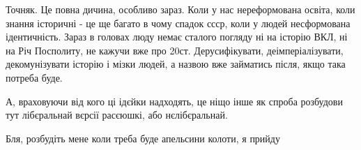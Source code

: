 \begin{itemize}
Точняк. Це повна дичина, особливо зараз. Коли у нас нереформована освіта, коли
знання історичні - це ще багато в чому спадок ссср, коли у людей несформована
ідентичність. Зараз в головах люду немає сталого погляду ні на історію ВКЛ, ні
на Річ Посполиту, не кажучи вже про 20ст. Дерусифікувати, деімперіалізувати,
декомунізувати історію і мізки людей, а назвою вже займатись після, якщо така
потреба буде.

А, враховуючи від кого ці ідєйки надходять, це ніщо інше як спроба розбудови
тут лібєральнай вєрсії расєюшкі, або нєлібєральнай.


 

Бля, розбудіть мене коли треба буде апельсини колоти, я прийду

\end{itemize}

